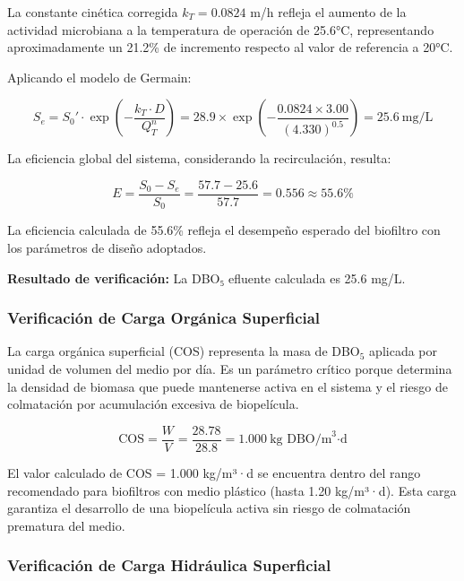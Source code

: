 \documentclass[12pt,a4paper]{article}
\begin{document}
La constante cinética corregida $k_T = 0.0824$ m/h refleja el aumento de la actividad microbiana a la temperatura de operación de 25.6°C, representando aproximadamente un 21.2\% de incremento respecto al valor de referencia a 20°C.

Aplicando el modelo de Germain:

\begin{equation}
S_e = S_0' \cdot \exp\!\left(-\frac{k_T \cdot D}{Q_T^n}\right) = 28.9 \times \exp\!\left(-\frac{0.0824 \times 3.00}{(4.330)^{0.5}}\right) = 25.6\ \text{mg/L}
\end{equation}

La eficiencia global del sistema, considerando la recirculación, resulta:

\begin{equation}
E = \frac{S_0 - S_e}{S_0} = \frac{57.7 - 25.6}{57.7} = 0.556 \approx 55.6\%
\end{equation}

La eficiencia calculada de 55.6\% refleja el desempeño esperado del biofiltro con los parámetros de diseño adoptados.

\textbf{Resultado de verificación:} La DBO₅ efluente calculada es 25.6 mg/L.

\subsubsection*{Verificación de Carga Orgánica Superficial}

La carga orgánica superficial (COS) representa la masa de DBO$_5$ aplicada por unidad de volumen del medio por día. Es un parámetro crítico porque determina la densidad de biomasa que puede mantenerse activa en el sistema y el riesgo de colmatación por acumulación excesiva de biopelícula.

\begin{equation}
\text{COS} = \frac{W}{V} = \frac{28.78}{28.8} = 1.000\ \text{kg DBO/m}^3\text{·d}
\end{equation}

El valor calculado de COS = 1.000 kg/m³·d se encuentra dentro del rango recomendado para biofiltros con medio plástico (hasta 1.20 kg/m³·d). Esta carga garantiza el desarrollo de una biopelícula activa sin riesgo de colmatación prematura del medio.

\subsubsection*{Verificación de Carga Hidráulica Superficial}
\end{document}
